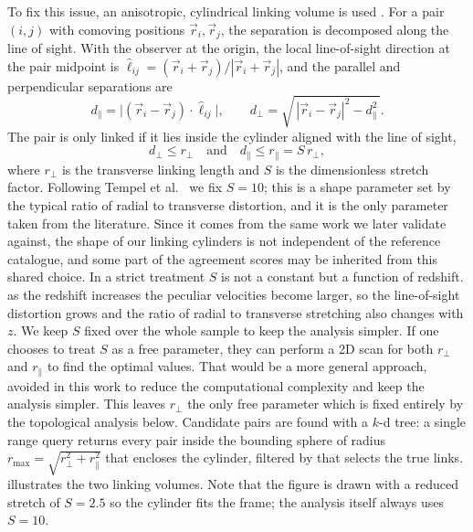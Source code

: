 \documentclass[9pt,a4paper,twocolumn,twoside]{rho-class/rho}
\begin{document}
To fix this issue, an anisotropic, cylindrical linking volume is used
\cite{tempel2014}. For a pair $(i,j)$ with comoving positions
$\vec r_i, \vec r_j$, the separation is decomposed along the line of sight. With
the observer at the origin, the local line-of-sight direction at the pair
midpoint is $\hat{\ell}_{ij} = (\vec r_i + \vec r_j)/|\vec r_i + \vec r_j|$,
and the parallel and perpendicular separations are
\begin{equation}\label{eq:decomp}
    d_\parallel = \bigl|(\vec r_i - \vec r_j)\cdot\hat{\ell}_{ij}\bigr|,
    \qquad
    d_\perp = \sqrt{\,|\vec r_i - \vec r_j|^2 - d_\parallel^2\,}.
\end{equation}
The pair is only linked if it lies inside the cylinder aligned with the line of
sight,
\begin{equation}\label{eq:cylinder}
    d_\perp \le r_\perp
    \quad\text{and}\quad
    d_\parallel \le r_\parallel = S\,r_\perp,
\end{equation}
where $r_\perp$ is the transverse linking length and $S$ is the dimensionless
stretch factor. Following Tempel et al.\ \cite{tempel2014} we fix $S = 10$;
this is a shape parameter set by the typical ratio of radial to transverse
distortion, and it is the only parameter taken from the literature. Since it
comes from the same work we later validate against, the shape of our linking
cylinders is not independent of the reference catalogue, and some part of the
agreement scores may be inherited from this shared choice. In a strict
treatment $S$ is not a constant but a function of redshift. as the redshift
increases the peculiar velocities become larger, so the line-of-sight distortion
grows and the ratio of radial to transverse stretching also changes with $z$. We
keep $S$ fixed over the whole sample to keep the analysis simpler. If one
chooses to treat $S$ as a free parameter, they can perform a 2D scan for both
$r_\perp$ and $r_\parallel$ to find the optimal values. That would be a more
general approach, avoided in this work to reduce the computational complexity
and keep the analysis simpler. This leaves $r_\perp$ the only free parameter
which is fixed entirely by the topological analysis below. Candidate pairs are
found with a $k$-d tree: a single range query returns every pair inside the
bounding sphere of radius $r_{\max} = \sqrt{r_\perp^2 + r_\parallel^2}$ that
encloses the cylinder, filtered by  that selects the true
links.  illustrates the two linking volumes. Note that
the figure is drawn with a reduced stretch of $S = 2.5$ so the cylinder fits
the frame; the analysis itself always uses $S = 10$.
\end{document}
